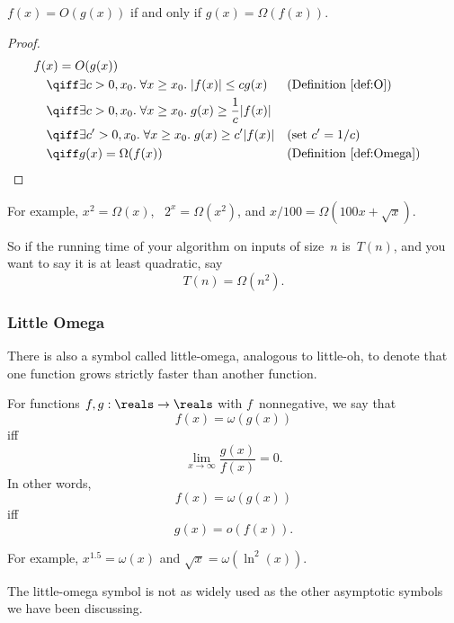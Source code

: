 \begin{theorem}\label{thm:9S2}
$f(x) = O(g(x))$ if and only if $g(x) = \Omega(f(x))$.
\end{theorem}

\begin{proof}
\begin{align*}
\lefteqn{f(x) = O(g(x))} \quad&\\
   & \qiff \exists c > 0, x_0. \; \forall x \ge x_0. \;
            |f(x)| \le c g(x) 
        && \text{(Definition~\ref{def:O})} \\
    & \qiff \exists c > 0, x_0. \; \forall x \ge x_0. \;
            g(x) \ge \frac{1}{c} |f(x)| \\
    & \qiff \exists c' > 0, x_0. \; \forall x \ge x_0. \;
            g(x) \ge c' |f(x)|
        && \text{(set $c' = 1/c$)} \\
    & \qiff g(x) = \Omega(f(x))
        && \text{(Definition~\ref{def:Omega})}
\qedhere
\end{align*}
\end{proof}

For example, $x^2 = \Omega(x)$, \ $2^x = \Omega(x^2)$, and $x/100 =
\Omega(100 x + \sqrt{x})$.

So if the running time of your algorithm on inputs of size~$n$
is~$T(n)$, and you want to say it is at least quadratic, say
\[
    T(n) = \Omega(n^2).
\]

\subsubsection{Little Omega}
                                   
There is also a symbol called little-omega, analogous to little-oh, to
denote that one function grows strictly faster than another function.

\begin{definition}\label{def:omega}
For functions $f, g: \reals \to \reals$ with $f$~nonnegative, we say
that
\[
    f(x) = \omega(g(x))
\]
iff
\[
    \lim_{x \to \infty} \frac{g(x)}{f(x)} = 0.
\]
In other words,
\[
    f(x) = \omega(g(x))
\]
iff
\[
    g(x) = o(f(x)).
\]
\end{definition}

For example, $x^{1.5} = \omega(x)$ and $\sqrt{x} = \omega(\ln^2(x))$.

The little-omega symbol is not as widely used as the other asymptotic
symbols we have been discussing.
\fi

